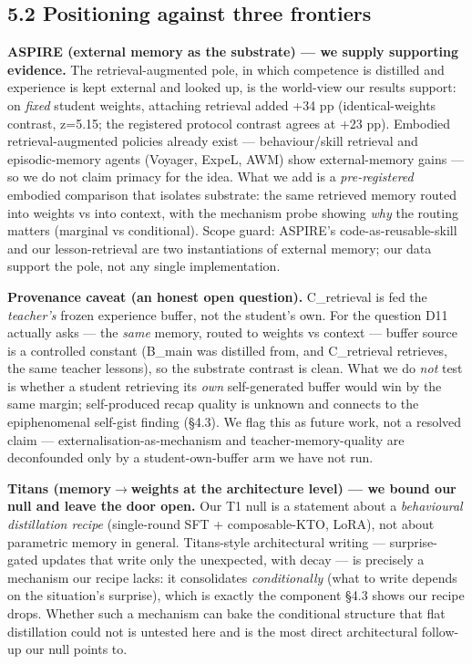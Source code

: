 \subsection*{5.2 Positioning against three frontiers}

\textbf{ASPIRE (external memory as the substrate) --- we supply supporting
evidence.} The retrieval-augmented pole, in which competence is
distilled and experience is kept external and looked up, is the
world-view our results support: on \emph{fixed} student weights, attaching
retrieval added +34 pp (identical-weights contrast, z=5.15; the
registered protocol contrast agrees at +23 pp). Embodied
retrieval-augmented policies already exist --- behaviour/skill retrieval
and episodic-memory agents (Voyager, ExpeL, AWM) show external-memory
gains --- so we do not claim primacy for the idea. What we add is a
\emph{pre-registered} embodied comparison that isolates substrate: the same
retrieved memory routed into weights vs into context, with the mechanism
probe showing \emph{why} the routing matters (marginal vs conditional). Scope
guard: ASPIRE's code-as-reusable-skill and our lesson-retrieval are two
instantiations of external memory; our data support the pole, not any
single implementation.

\textbf{Provenance caveat (an honest open question).} C\_retrieval is fed the
\emph{teacher's} frozen experience buffer, not the student's own. For the
question D11 actually asks --- the \emph{same} memory, routed to weights vs
context --- buffer source is a controlled constant (B\_main was distilled
from, and C\_retrieval retrieves, the same teacher lessons), so the
substrate contrast is clean. What we do \emph{not} test is whether a student
retrieving its \emph{own} self-generated buffer would win by the same margin;
self-produced recap quality is unknown and connects to the epiphenomenal
self-gist finding (\S4.3). We flag this as future work, not a resolved
claim --- externalisation-as-mechanism and teacher-memory-quality are
deconfounded only by a student-own-buffer arm we have not run.

\textbf{Titans (memory$\rightarrow$weights at the architecture level) --- we bound our
null and leave the door open.} Our T1 null is a statement about a
\emph{behavioural distillation recipe} (single-round SFT + composable-KTO,
LoRA), not about parametric memory in general. Titans-style
architectural writing --- surprise-gated updates that write only the
unexpected, with decay --- is precisely a mechanism our recipe lacks: it
consolidates \emph{conditionally} (what to write depends on the situation's
surprise), which is exactly the component \S4.3 shows our recipe drops.
Whether such a mechanism can bake the conditional structure that flat
distillation could not is untested here and is the most direct
architectural follow-up our null points to.

